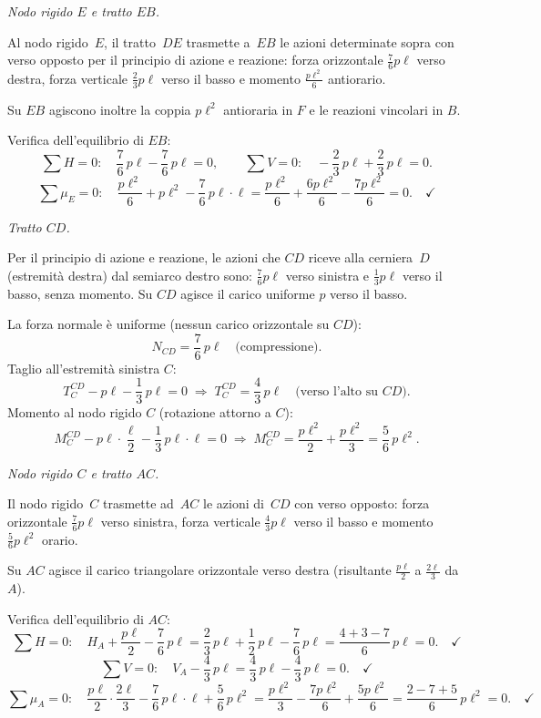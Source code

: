\medskip
\noindent\textit{Nodo rigido $E$ e tratto $EB$.}

Al nodo rigido~$E$, il tratto~$DE$ trasmette a~$EB$ le azioni
determinate sopra con verso opposto per il principio di azione
e reazione:
forza orizzontale $\tfrac{7}{6}p\ell$ verso destra,
forza verticale $\tfrac{2}{3}p\ell$ verso il basso
e momento $\tfrac{p\ell^2}{6}$ antiorario.

Su $EB$ agiscono inoltre la coppia $p\ell^2$ antioraria in $F$
e le reazioni vincolari in $B$.

\noindent Verifica dell'equilibrio di $EB$:
\[
\sum H = 0:\quad
\frac{7}{6}\,p\ell - \frac{7}{6}\,p\ell = 0,
\qquad
\sum V = 0:\quad
-\frac{2}{3}\,p\ell + \frac{2}{3}\,p\ell = 0.
\]
\[
\sum \mu_E = 0:\quad
\frac{p\ell^2}{6}
+ p\ell^2
- \frac{7}{6}\,p\ell\cdot\ell
= \frac{p\ell^2}{6} + \frac{6p\ell^2}{6} - \frac{7p\ell^2}{6}
= 0.\quad\checkmark
\]

\medskip
\noindent\textit{Tratto $CD$.}

Per il principio di azione e reazione, le azioni che $CD$ riceve
alla cerniera~$D$ (estremità destra) dal semiarco destro sono:
$\tfrac{7}{6}p\ell$ verso sinistra e $\tfrac{1}{3}p\ell$
verso il basso, senza momento.
Su $CD$ agisce il carico uniforme $p$ verso il basso.

La forza normale è uniforme (nessun carico orizzontale su $CD$):
\[
N_{CD} = \frac{7}{6}\,p\ell \quad\text{(compressione).}
\]
Taglio all'estremità sinistra $C$:
\[
T_C^{CD} - p\ell - \frac{1}{3}\,p\ell = 0
\;\Rightarrow\;
T_C^{CD} = \frac{4}{3}\,p\ell
\quad\text{(verso l'alto su }CD\text{).}
\]
Momento al nodo rigido $C$ (rotazione attorno a $C$):
\[
M_C^{CD} - p\ell\cdot\frac{\ell}{2} - \frac{1}{3}\,p\ell\cdot\ell = 0
\;\Rightarrow\;
M_C^{CD} = \frac{p\ell^2}{2} + \frac{p\ell^2}{3}
= \frac{5}{6}\,p\ell^2.
\]

\medskip
\noindent\textit{Nodo rigido $C$ e tratto $AC$.}

Il nodo rigido~$C$ trasmette ad~$AC$ le azioni di~$CD$ con verso
opposto: forza orizzontale $\tfrac{7}{6}p\ell$ verso sinistra,
forza verticale $\tfrac{4}{3}p\ell$ verso il basso
e momento $\tfrac{5}{6}p\ell^2$ orario.

Su $AC$ agisce il carico triangolare orizzontale verso destra
(risultante $\tfrac{p\ell}{2}$ a $\tfrac{2\ell}{3}$ da~$A$).

\noindent Verifica dell'equilibrio di $AC$:
\[
\sum H = 0:\quad
H_A + \frac{p\ell}{2} - \frac{7}{6}\,p\ell
= \frac{2}{3}\,p\ell + \frac{1}{2}\,p\ell - \frac{7}{6}\,p\ell
= \frac{4+3-7}{6}\,p\ell = 0.\quad\checkmark
\]
\[
\sum V = 0:\quad
V_A - \frac{4}{3}\,p\ell
= \frac{4}{3}\,p\ell - \frac{4}{3}\,p\ell = 0.\quad\checkmark
\]
\[
\sum \mu_A = 0:\quad
\frac{p\ell}{2}\cdot\frac{2\ell}{3}
- \frac{7}{6}\,p\ell\cdot\ell
+ \frac{5}{6}\,p\ell^2
= \frac{p\ell^2}{3} - \frac{7p\ell^2}{6} + \frac{5p\ell^2}{6}
= \frac{2-7+5}{6}\,p\ell^2 = 0.\quad\checkmark
\]

